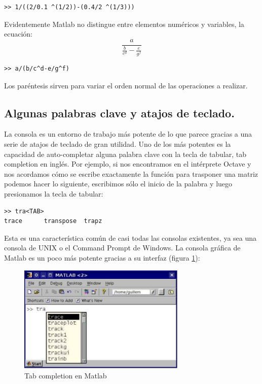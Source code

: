 \begin{lstlisting}
>> 1/((2/0.1 ^(1/2))-(0.4/2 ^(1/3)))
\end{lstlisting}

Evidentemente Matlab no distingue entre elementos numéricos y
variables, la ecuación:
$$\frac{a}{\frac{b}{c{}^{d}}-\frac{e}{g^{f}}}$$
\begin{lstlisting}
>> a/(b/c^d-e/g^f)
\end{lstlisting}

Los paréntesis sirven para variar el orden normal de las operaciones a
realizar.


\subsection{Algunas palabras clave y atajos de teclado.}

La consola es un entorno de trabajo más potente de lo que parece
gracias a una serie de atajos de teclado de gran utilidad. Uno de los
más potentes es la capacidad de auto-completar alguna palabra clave
con la tecla de tabular, tab completion en inglés. Por ejemplo, si nos
encontramos en el intérprete Octave y nos acordamos cómo se escribe
exactamente la función para trasponer una matriz podemos hacer lo
siguiente, escribimos sólo el inicio de la palabra y luego presionamos
la tecla de tabular:

\begin{lstlisting}
>> tra<TAB>
trace      transpose  trapz
\end{lstlisting}

Esta es una característica común de casi todas las consolas
existentes, ya sea una consola de UNIX o el Command Prompt de Windows.
La consola gráfica de Matlab es un poco más potente gracias a su
interfaz (figura \ref{cap:Tab-completion-en}):

%
\begin{figure}[h]
  \centering{}\includegraphics[width=8cm,
  keepaspectratio]{figuras/autocompletion}


  \caption{\label{cap:Tab-completion-en}Tab completion en Matlab}
\end{figure}



